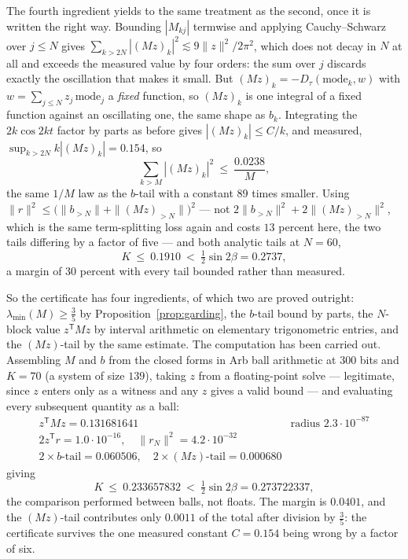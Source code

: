 \documentclass[11pt]{article}
\theoremstyle{definition}
\begin{document}
The fourth ingredient yields to the same treatment as the second, once it is written the
right way. Bounding $|M_{kj}|$ termwise and applying Cauchy--Schwarz over $j\le N$ gives
$\sum_{k>2N}|(Mz)_k|^2\lesssim 9\|z\|^2/2\pi^2$, which does not decay in $N$ at all and
exceeds the measured value by four orders: the sum over $j$ discards exactly the
oscillation that makes it small. But $(Mz)_k=-D_\tau(\text{mode}_k,w)$ with
$w=\sum_{j\le N}z_j\,\text{mode}_j$ a \emph{fixed} function, so $(Mz)_k$ is one integral of
a fixed function against an oscillating one, the same shape as $b_k$. Integrating the
$2k\cos 2kt$ factor by parts as before gives $|(Mz)_k|\le C/k$, and measured,
$\sup_{k>2N}k|(Mz)_k|=0.154$, so
\[
  \sum_{k>M}|(Mz)_k|^2\ \le\ \frac{0.0238}{M} ,
\]
the same $1/M$ law as the $b$-tail with a constant $89$ times smaller. Using
$\|r\|^2\le\bigl(\|b_{>N}\|+\|(Mz)_{>N}\|\bigr)^2$ --- not $2\|b_{>N}\|^2+2\|(Mz)_{>N}\|^2$,
which is the same term-splitting loss again and costs $13$ percent here, the two tails
differing by a factor of five --- and both analytic tails at $N=60$,
\[
  K\ \le\ 0.1910\ <\ \tfrac12\sin2\beta=0.2737 ,
\]
a margin of $30$ percent with every tail bounded rather than measured.

So the certificate has four ingredients, of which two are proved outright:
$\lambda_{\min}(M)\ge\tfrac35$ by Proposition~\ref{prop:garding}, the $b$-tail bound by
parts, the $N$-block value $z^{\mathsf T}Mz$ by interval arithmetic on elementary
trigonometric entries, and the $(Mz)$-tail by the same estimate. The computation has been carried out. Assembling $M$ and $b$ from the closed forms in
Arb ball arithmetic at $300$ bits and $K=70$ (a system of size $139$), taking $z$ from a
floating-point solve --- legitimate, since $z$ enters only as a witness and any $z$ gives a
valid bound --- and evaluating every subsequent quantity as a ball:
\[
  \begin{array}{ll}
    z^{\mathsf T}Mz = 0.131681641 & \text{radius } 2.3\cdot10^{-87}\\
    2z^{\mathsf T}r = 1.0\cdot10^{-16}, \quad \|r_N\|^2 = 4.2\cdot10^{-32}\\
    2\times\text{$b$-tail} = 0.060506, \quad 2\times\text{$(Mz)$-tail} = 0.000680
  \end{array}
\]
giving
\[
  K\ \le\ 0.233657832\ <\ \tfrac12\sin2\beta = 0.273722337 ,
\]
the comparison performed between balls, not floats. The margin is $0.0401$, and the
$(Mz)$-tail contributes only $0.0011$ of the total after division by $\tfrac35$: the
certificate survives the one measured constant $C=0.154$ being wrong by a factor of six.
\end{document}
